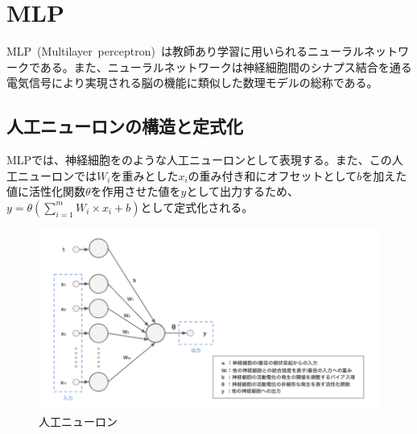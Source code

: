 \section{MLP}

MLP~(Multilayer~perceptron)~は教師あり学習に用いられるニューラルネットワークである。また、ニューラルネットワークは神経細胞間のシナプス結合を通る電気信号により実現される脳の機能に類似した数理モデルの総称である。

\subsection{人工ニューロンの構造と定式化}

MLPでは、神経細胞をのような人工ニューロンとして表現する。また、この人工ニューロンでは$W_i$を重みとした$x_i$の重み付き和にオフセットとして$b$を加えた値に活性化関数$\theta$を作用させた値を$y$として出力するため、$y=\theta(\sum_{i=1}^{m} W_{i} \times x_i+b)$として定式化される。

\clearpage

\begin{figure}[t]
\centering
\includegraphics[width=0.9\columnwidth]{figure/neuron.png}
\caption[MLPの人工ニューロン]{人工ニューロン}
\label{fig:neuron}
\end{figure}

